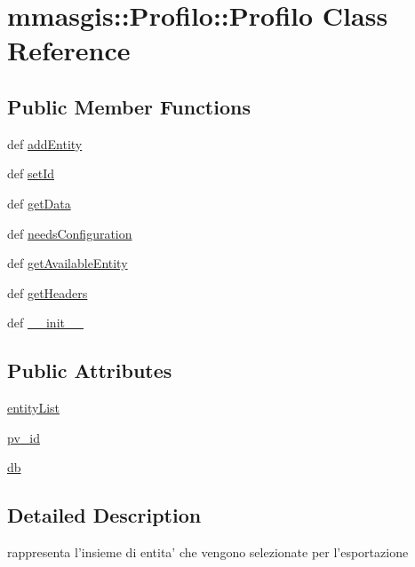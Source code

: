 \hypertarget{classmmasgis_1_1Profilo_1_1Profilo}{
\section{mmasgis::Profilo::Profilo Class Reference}
\label{classmmasgis_1_1Profilo_1_1Profilo}
}
\subsection*{Public Member Functions}
\begin{DoxyCompactItemize}
\item 
def \hyperlink{classmmasgis_1_1Profilo_1_1Profilo_afa8f86b4bae2e92597befe026e56037b}{addEntity}
\item 
def \hyperlink{classmmasgis_1_1Profilo_1_1Profilo_acde3b418afd615b35a94988d2d770a3f}{setId}
\item 
def \hyperlink{classmmasgis_1_1Profilo_1_1Profilo_a804680366585bd0e69118bf1d5299a74}{getData}
\item 
def \hyperlink{classmmasgis_1_1Profilo_1_1Profilo_a7abe9504b687d5cec1ab5cca00ae3098}{needsConfiguration}
\item 
def \hyperlink{classmmasgis_1_1Profilo_1_1Profilo_afeae7adb69f0c0495e18541506ce23ec}{getAvailableEntity}
\item 
def \hyperlink{classmmasgis_1_1Profilo_1_1Profilo_a35d20203c4de5f4047f9496dcdbe6035}{getHeaders}
\item 
def \hyperlink{classmmasgis_1_1Profilo_1_1Profilo_aa86f9f8e468a2ed1c2b5db0a4033b276}{\_\-\_\-init\_\-\_\-}
\end{DoxyCompactItemize}
\subsection*{Public Attributes}
\begin{DoxyCompactItemize}
\item 
\hyperlink{classmmasgis_1_1Profilo_1_1Profilo_ac62cbc02b899eed08145eff52b73ed8f}{entityList}
\item 
\hyperlink{classmmasgis_1_1Profilo_1_1Profilo_acb0fb36a472588a1e131116029b949b8}{pv\_\-id}
\item 
\hyperlink{classmmasgis_1_1Profilo_1_1Profilo_a0a030e9302bc47528ae29ed3590651bb}{db}
\end{DoxyCompactItemize}


\subsection{Detailed Description}
\begin{DoxyVerb}
rappresenta l'insieme di entita' che vengono selezionate per l'esportazione
\end{DoxyVerb}
 


